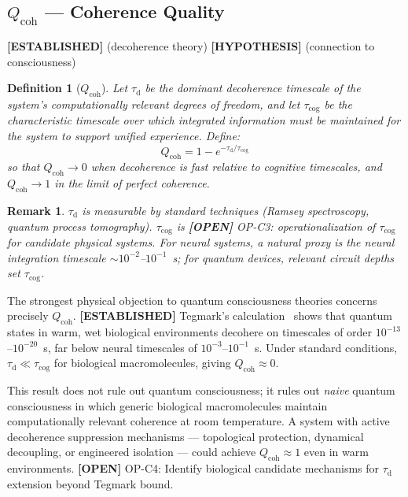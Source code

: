 \documentclass[12pt,letterpaper]{article}
\newtheorem{definition}{Definition}[section]
\newtheorem{remark}{Remark}[section]
\newcommand{\ESTABLISHED}[1]{\textcolor{green!50!black}{\textbf{[ESTABLISHED]}} #1}
\newcommand{\HYPOTHESIS}[1]{\textcolor{blue!70!black}{\textbf{[HYPOTHESIS]}} #1}
\newcommand{\OPEN}[1]{\textcolor{red!70!black}{\textbf{[OPEN]}} #1}
\newcommand{\Qcoh}{Q_{\mathrm{coh}}}
\newcommand{\taud}{\tau_{\mathrm{d}}}
\newcommand{\taucog}{\tau_{\mathrm{cog}}}
\begin{document}
\subsection{\texorpdfstring{$\Qcoh$ — Coherence Quality}{Qcoh — Coherence Quality}}
\label{sec:Qcoh}

\ESTABLISHED{} (decoherence theory) \HYPOTHESIS{} (connection to consciousness)

\begin{definition}[$\Qcoh$]
Let $\taud$ be the dominant decoherence timescale of the system's
computationally relevant degrees of freedom, and let $\taucog$ be the
characteristic timescale over which integrated information must be
maintained for the system to support unified experience. Define:
\begin{equation}
  \Qcoh = 1 - e^{-\taud / \taucog}
  \label{eq:Qcoh}
\end{equation}
so that $\Qcoh \to 0$ when decoherence is fast relative to cognitive
timescales, and $\Qcoh \to 1$ in the limit of perfect coherence.
\end{definition}

\begin{remark}
$\taud$ is measurable by standard techniques (Ramsey spectroscopy, quantum
process tomography). $\taucog$ is \OPEN{OP-C3: operationalization of
$\taucog$ for candidate physical systems.} For neural systems, a natural
proxy is the neural integration timescale $\sim 10^{-2}$--$10^{-1}$~s;
for quantum devices, relevant circuit depths set $\taucog$.
\end{remark}

The strongest physical objection to quantum consciousness theories concerns
precisely $\Qcoh$. \ESTABLISHED{} Tegmark's calculation~\cite{Tegmark2000}
shows that quantum states in warm, wet biological environments decohere on
timescales of order $10^{-13}$--$10^{-20}$~s, far below neural timescales of
$10^{-3}$--$10^{-1}$~s. Under standard conditions,
$\taud \ll \taucog$ for biological macromolecules, giving $\Qcoh \approx 0$.

This result does not rule out quantum consciousness; it rules out
\emph{naive} quantum consciousness in which generic biological macromolecules
maintain computationally relevant coherence at room temperature. A system
with active decoherence suppression mechanisms --- topological protection,
dynamical decoupling, or engineered isolation --- could achieve
$\Qcoh \approx 1$ even in warm environments. \OPEN{OP-C4: Identify
biological candidate mechanisms for $\taud$ extension beyond Tegmark bound.}
\end{document}
